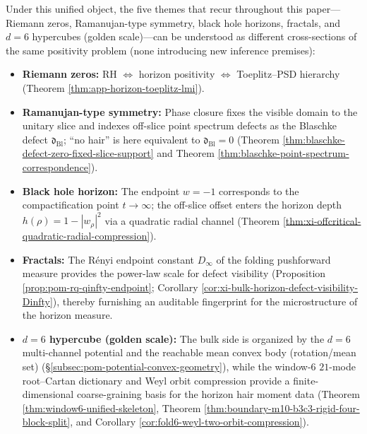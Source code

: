 Under this unified object, the five themes that recur throughout this paper---Riemann zeros, Ramanujan-type symmetry, black hole horizons, fractals, and \(d=6\) hypercubes (golden scale)---can be understood as different cross-sections of the same positivity problem (none introducing new inference premises):
\begin{itemize}
  \item \textbf{Riemann zeros:} RH \(\Leftrightarrow\) horizon positivity \(\Leftrightarrow\) Toeplitz--PSD hierarchy (Theorem \ref{thm:app-horizon-toeplitz-lmi}).
  \item \textbf{Ramanujan-type symmetry:} Phase closure fixes the visible domain to the unitary slice and indexes off-slice point spectrum defects as the Blaschke defect \(\mathfrak d_{\mathrm{Bl}}\); ``no hair'' is here equivalent to \(\mathfrak d_{\mathrm{Bl}}=0\) (Theorem \ref{thm:blaschke-defect-zero-fixed-slice-support} and Theorem \ref{thm:blaschke-point-spectrum-correspondence}).
  \item \textbf{Black hole horizon:} The endpoint \(w=-1\) corresponds to the compactification point \(t\to\infty\); the off-slice offset enters the horizon depth \(h(\rho)=1-|w_\rho|^2\) via a quadratic radial channel (Theorem \ref{thm:xi-offcritical-quadratic-radial-compression}).
  \item \textbf{Fractals:} The R\'enyi endpoint constant \(D_\infty\) of the folding pushforward measure provides the power-law scale for defect visibility (Proposition \ref{prop:pom-rq-qinfty-endpoint}; Corollary \ref{cor:xi-bulk-horizon-defect-visibility-Dinfty}), thereby furnishing an auditable fingerprint for the microstructure of the horizon measure.
  \item \textbf{\(d=6\) hypercube (golden scale):} The bulk side is organized by the \(d=6\) multi-channel potential and the reachable mean convex body (rotation/mean set) (\S\ref{subsec:pom-potential-convex-geometry}), while the window-\(6\) \(21\)-mode root--Cartan dictionary and Weyl orbit compression provide a finite-dimensional coarse-graining basis for the horizon hair moment data (Theorem \ref{thm:window6-unified-skeleton}, Theorem \ref{thm:boundary-m10-b3c3-rigid-four-block-split}, and Corollary \ref{cor:fold6-weyl-two-orbit-compression}).
\end{itemize}

